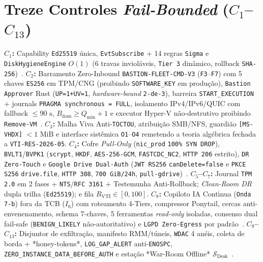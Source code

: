 \documentclass[10pt,twocolumn]{article}
\begin{document}
\section{Treze Controles \emph{Fail-Bounded} ($C_1$--$C_{13}$)}

\textbf{$C_1$:} Capability \texttt{Ed25519} \'{u}nica, \texttt{EvtSubscribe} + 14 regras \texttt{Sigma} e \texttt{DiskHygieneEngine} $O(1)$ (6 travas inviol\'{a}veis, \texttt{Tier 3} din\^{a}mico, rollback \texttt{SHA-256})~\cite{R46,R47,R53}.
\textbf{$C_2$:} Barramento Zero-Inbound \texttt{BASTION-FLEET-CMD-V3} (\texttt{F3}--\texttt{F7}) com 5 chaves \texttt{ES256} em TPM/CNG (proibindo \texttt{SOFTWARE\_KEY} em produ\c{c}\~{a}o), \texttt{Bastion Approver} Rust (\texttt{UP=1+UV=1}, \emph{hardware-bound} \texttt{2-de-3}), barreira \texttt{START\_EXECUTION} + journals \texttt{PRAGMA synchronous = FULL}, isolamento IPv4/IPv6/QUIC com fallback $\le 90\text{ s}$, $B_{\mathrm{dom}} \ge Q_{\min}+1$ e executor Hyper-V n\~{a}o-destrutivo proibindo \texttt{Remove-VM}~\cite{R04,R41,R44,R45,R49,R59,R61,R62}.
\textbf{$C_3$:} Malha Viva Anti-\texttt{TOCTOU}, atribui\c{c}\~{a}o SMB/NFS, guardi\~{a}o \texttt{[MS-VHDX]} $< 1\text{ MiB}$ e interface sist\^{e}mica \texttt{O1}--\texttt{O4} remetendo a teoria alg\'{e}brica fechada a \texttt{VTI-RES-2026-05}.
\textbf{$C_4$:} Cofre \emph{Pull-Only} (\texttt{nic\_prod} \texttt{100\% SYN DROP}), \texttt{BVLT1}/\texttt{BVPK1} (\texttt{scrypt}, \texttt{HKDF}, \texttt{AES-256-GCM}, \texttt{FASTCDC\_NC2}, \texttt{HTTP 206} estrito), \texttt{DR Zero-Touch} e \texttt{Google Drive Dual-Auth} (\texttt{JWT RS256} \texttt{canDelete=false} e \texttt{PKCE S256} \texttt{drive.file}, \texttt{HTTP 308}, \texttt{700 GiB/24h}, \texttt{pull-gdrive})~\cite{R02,R33,R35,R36,R37,R38,R50,R51}.
\textbf{$C_5$--$C_7$:} Journal \texttt{TPM 2.0} em 2 fases + \texttt{NTS}/\texttt{RFC 3161} + Testemunha Anti-Rollback; \emph{Clean-Room DR} dupla trilha (\texttt{Ed25519}); e fila $R_{\mathrm{VTI}} \in [0,100]$.
\textbf{$C_8$:} Copiloto IA Cont\'{\i}nua (\texttt{Onda 7-b}) fora da TCB ($I_6$) com roteamento 4-Tiers, compressor Ponytail, cercas anti-envenenamento, schema 7-chaves, 5 ferramentas \emph{read-only} isoladas, consenso dual fail-safe (\texttt{BENIGN\_LIKELY} n\~{a}o-autoritativo) e \texttt{LGPD Zero-Egress} por padr\~{a}o~\cite{R54,R55,R56,R57,R58}.
\textbf{$C_9$--$C_{13}$:} Disjuntor de exfiltra\c{c}\~{a}o, manifesto RMM/t\'{u}neis, \texttt{WDAC} 4 an\'{e}is, coleta de borda + *honey-tokens*, \texttt{LOG\_GAP\_ALERT} anti-\texttt{ENOSPC}, \texttt{ZERO\_INSTANCE\_DATA\_BEFORE\_AUTH} e esta\c{c}\~{a}o *War-Room Offline* $\mathcal{S}_{\mathrm{Desk}}$~\cite{R29,R30,R31,R32}.
\end{document}
